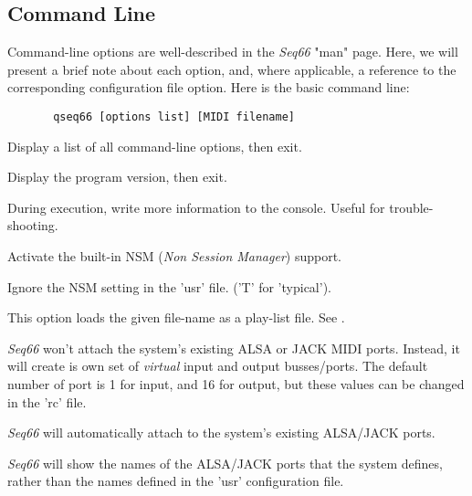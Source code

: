 \subsection{Command Line}
\label{subsec:configuration_command_line}

   Command-line options are well-described in the \textsl{Seq66} "man" page.
   Here, we will present a brief note about each option, and, where applicable, a
   reference to the corresponding configuration file option.
   Here is the basic command line:

   \begin{verbatim}
       qseq66 [options list] [MIDI filename]
   \end{verbatim}

      Display a list of all command-line options, then exit.

      Display the program version, then exit.

      During execution, write more information to the console.  Useful for
      trouble-shooting.
   
      Activate the built-in NSM (\textsl{Non Session Manager}) support.

      Ignore the NSM setting in the 'usr' file. ('T' for 'typical').

      This option loads the given file-name as a play-list file.
      See .



      \textsl{Seq66} won't attach the system's existing ALSA or JACK MIDI ports.
      Instead, it will create is own set of \textsl{virtual}
      input and output busses/ports.  The default number of port is 1 for input,
      and 16 for output, but these values can be changed in the 'rc' file.


      \textsl{Seq66} will automatically attach to the system's existing
      ALSA/JACK ports.


      \textsl{Seq66} will show the names of the ALSA/JACK ports that the system
      defines, rather than the names defined in the 'usr' configuration file.

